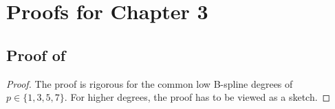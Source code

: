 \section{Proofs for Chapter 3}

\subsection[Proof of Proposition~\ref*{prop:hierBSplineLinearlyIndependent}]{%
  Proof of \texorpdfstring{%
  }{%
    Proposition \ref{prop:hierBSplineLinearlyIndependent}%
  }%
}
\label{sec:proofHierBSplineLinearlyIndependent}

\propHierBSplineLinearlyIndependent*

\begin{proof}
  The proof is rigorous for the common low B-spline degrees of
  $p \in \{1, 3, 5, 7\}$.
  For higher degrees, the proof has to be viewed as a sketch.
  

\end{proof}
